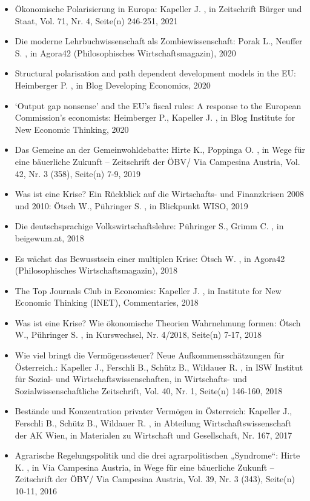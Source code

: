 \begin{itemize}
\item Ökonomische Polarisierung in Europa: Kapeller J. , in Zeitschrift Bürger und Staat, Vol. 71, Nr. 4, Seite(n) 246-251, 2021
\item Die moderne Lehrbuchwissenschaft als Zombiewissenschaft: Porak L., Neuffer S. , in Agora42 (Philosophisches Wirtschaftsmagazin), 2020
\item Structural polarisation and path dependent development models in the EU: Heimberger P. , in Blog Developing Economics, 2020
\item ‘Output gap nonsense’ and the EU’s fiscal rules: A response to the European Commission’s economists: Heimberger P., Kapeller J. , in Blog Institute for New Economic Thinking, 2020
\item Das Gemeine an der Gemeinwohldebatte: Hirte K., Poppinga O. , in Wege für eine bäuerliche Zukunft – Zeitschrift der ÖBV/ Via Campesina Austria, Vol. 42, Nr. 3 (358), Seite(n) 7-9, 2019
\item Was ist eine Krise? Ein Rückblick auf die Wirtschafts- und Finanzkrisen 2008 und 2010: Ötsch W., Pühringer S. , in Blickpunkt WISO, 2019
\item Die deutschsprachige Volkswirtschaftslehre: Pühringer S., Grimm C. , in beigewum.at, 2018
\item Es wächst das Bewusstsein einer multiplen Krise: Ötsch W. , in Agora42 (Philosophisches Wirtschaftsmagazin), 2018
\item The Top Journals Club in Economics: Kapeller J. , in Institute for New Economic Thinking (INET), Commentaries, 2018
\item Was ist eine Krise? Wie ökonomische Theorien Wahrnehmung formen: Ötsch W., Pühringer S. , in Kurswechsel, Nr. 4/2018, Seite(n) 7-17, 2018
\item Wie viel bringt die Vermögenssteuer? Neue Aufkommensschätzungen für Österreich.: Kapeller J., Ferschli B., Schütz B., Wildauer R. , in ISW Institut für Sozial- und Wirtschaftswissenschaften, in Wirtschafts- und Sozialwissenschaftliche Zeitschrift, Vol. 40, Nr. 1, Seite(n) 146-160, 2018
\item Bestände und Konzentration privater Vermögen in Österreich: Kapeller J., Ferschli B., Schütz B., Wildauer R. , in Abteilung Wirtschaftswissenschaft der AK Wien, in Materialen zu Wirtschaft und Gesellschaft, Nr. 167, 2017
\item Agrarische Regelungspolitik und die drei agrarpolitischen „Syndrome“: Hirte K. , in Via Campesina Austria, in Wege für eine bäuerliche Zukunft – Zeitschrift der ÖBV/ Via Campesina Austria, Vol. 39, Nr. 3 (343), Seite(n) 10-11, 2016

\end{itemize}
